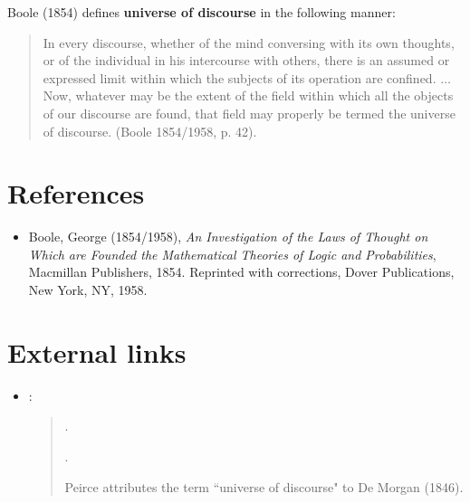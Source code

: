 \documentclass[12pt]{article}
\begin{document}

Boole (1854) defines \textbf{universe of discourse} in the following manner:

\begin{quote}
In every discourse, whether of the mind conversing with its own thoughts, or of the individual in his intercourse with others, there is an assumed or expressed limit within which the subjects of its operation are confined. $\ldots$ Now, whatever may be the extent of the field within which all the objects of our discourse are found, that field may properly be termed the universe of discourse.  (Boole 1854/1958, p. 42).
\end{quote}

\section{References}

\begin{itemize}\item
Boole, George (1854/1958), \textit{An Investigation of the Laws of Thought on Which are Founded the Mathematical Theories of Logic and Probabilities}, Macmillan Publishers, 1854.  Reprinted with corrections, Dover Publications, New York, NY, 1958.
\end{itemize}

\section{External links}
\begin{itemize}\item
{}:
\begin{quote}
.

.

Peirce attributes the term ``universe of discourse" to De Morgan (1846).
\end{quote}
\end{itemize}

\end{document}
